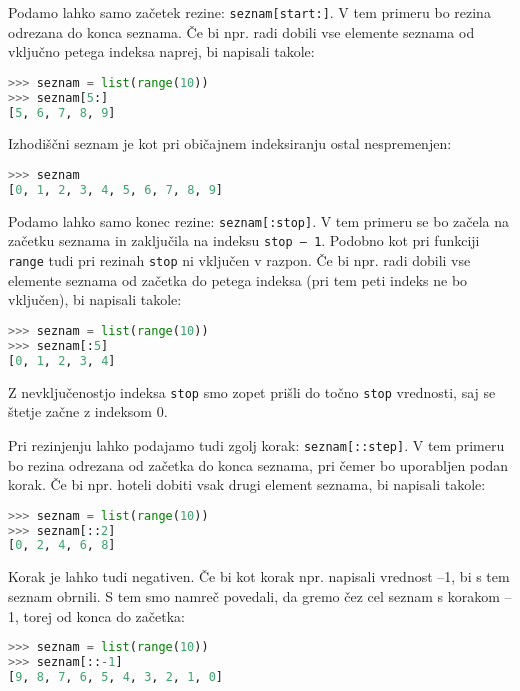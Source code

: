 Podamo lahko samo začetek rezine: \texttt{seznam[start:]}.  V tem primeru bo rezina odrezana do konca seznama. Če bi npr. radi dobili vse elemente seznama od vključno petega indeksa naprej, bi napisali takole:
\begin{lstlisting}[language=Python]
>>> seznam = list(range(10))
>>> seznam[5:]
[5, 6, 7, 8, 9]
\end{lstlisting}
Izhodiščni seznam je kot pri običajnem indeksiranju ostal nespremenjen:
\begin{lstlisting}[language=Python]
>>> seznam
[0, 1, 2, 3, 4, 5, 6, 7, 8, 9]
\end{lstlisting}

Podamo lahko samo konec rezine: \texttt{seznam[:stop]}.  V tem primeru se bo začela na začetku seznama in zaključila na indeksu \texttt{stop -- 1}. Podobno kot pri funkciji \texttt{range} tudi pri rezinah \texttt{stop} ni vključen v razpon. Če bi npr. radi dobili vse elemente seznama od začetka do petega indeksa (pri tem peti indeks ne bo vključen), bi napisali takole:
\begin{lstlisting}[language=Python]
>>> seznam = list(range(10))
>>> seznam[:5]
[0, 1, 2, 3, 4]
\end{lstlisting}
Z nevključenostjo indeksa \texttt{stop} smo zopet prišli do točno \texttt{stop} vrednosti, saj se štetje začne z indeksom 0. 

Pri rezinjenju lahko podajamo tudi zgolj korak: \texttt{seznam[::step]}. V tem primeru bo rezina odrezana od začetka do konca seznama, pri čemer bo uporabljen podan korak. Če bi npr. hoteli dobiti vsak drugi element seznama, bi napisali takole:
\begin{lstlisting}[language=Python]
>>> seznam = list(range(10))
>>> seznam[::2]
[0, 2, 4, 6, 8]
\end{lstlisting}
Korak je lahko tudi negativen. Če bi kot korak npr. napisali vrednost --1, bi s tem seznam obrnili. S tem smo namreč povedali, da gremo čez cel seznam s korakom --1, torej od konca do začetka:
\begin{lstlisting}[language=Python]
>>> seznam = list(range(10))
>>> seznam[::-1]
[9, 8, 7, 6, 5, 4, 3, 2, 1, 0]
\end{lstlisting}

